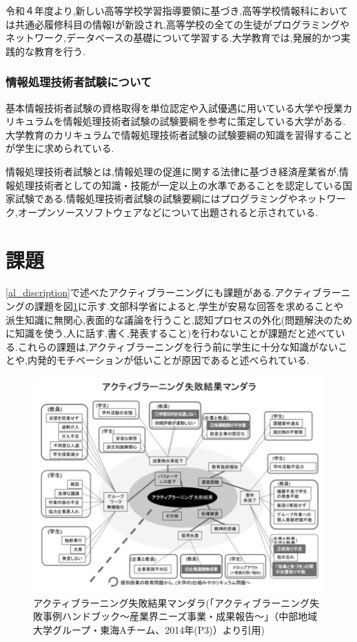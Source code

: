 \documentclass[11pt, a4paper]{jreport}
\begin{document}
令和４年度より,新しい高等学校学習指導要領に基づき,高等学校情報科においては共通必履修科目の情報Iが新設され,高等学校の全ての生徒がプログラミングやネットワーク,データベースの基礎について学習する\cite{bib:zyouhou}.大学教育では,発展的かつ実践的な教育を行う.

\subsubsection{情報処理技術者試験について}

基本情報技術者試験の資格取得を単位認定や入試優遇に用いている大学や授業カリキュラムを情報処理技術者試験の試験要綱を参考に策定している大学がある.大学教育のカリキュラムで情報処理技術者試験の試験要綱の知識を習得することが学生に求められている.

情報処理技術者試験とは,情報処理の促進に関する法律に基づき経済産業省が,情報処理技術者としての知識・技能が一定以上の水準であることを認定している国家試験である.情報処理技術者試験の試験要綱にはプログラミングやネットワーク,オープンソースソフトウェアなどについて出題されると示されている\cite{bib:kihonzyouhou_hani}.

\section{課題}\label{kadai_dai}

\ref{al_discription}で述べたアクティブラーニングにも課題がある.アクティブラーニングの課題を図\ref{fig:active_shippai}に示す.文部科学省によると,学生が安易な回答を求めることや派生知識に無関心,表面的な議論を行うこと,認知プロセスの外化(問題解決のために知識を使う,人に話す,書く,発表すること)を行わないことが課題だと述べている.これらの課題は,アクティブラーニングを行う前に学生に十分な知識がないことや,内発的モチベーションが低いことが原因であると述べられている\cite{bib:al_mondai}.

\begin{figure}[H]
\begin{center}
\includegraphics[width=140mm]{./img/al_mondai.png}
\caption{アクティブラーニング失敗結果マンダラ(「アクティブラーニング失敗事例ハンドブック～産業界ニーズ事業・成果報告～」（中部地域大学グループ・東海Aチーム、2014年(P3)）より引用)}
\label{fig:active_shippai}
\end{center}
\end{figure}
\end{document}

